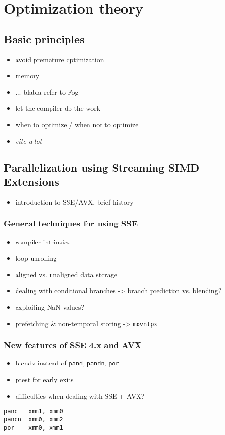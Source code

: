 \section{Optimization theory}
\subsection{Basic principles}
\begin{itemize}
\item avoid premature optimization
\item memory
\item ... blabla refer to Fog
\item let the compiler do the work
\item when to optimize / when not to optimize
\item \emph{cite a lot}
\end{itemize}
\subsection{Parallelization using Streaming SIMD Extensions}
\begin{itemize}
\item introduction to SSE/AVX, brief history
\end{itemize}
\subsubsection{General techniques for using SSE}
\begin{itemize}
\item compiler intrinsics
\item loop unrolling
\item aligned vs. unaligned data storage
\item dealing with conditional branches -> branch prediction vs. blending?
\item exploiting NaN values?
\item prefetching \& non-temporal storing -> \texttt{movntps}
\end{itemize}
\subsubsection{New features of SSE 4.x and AVX}
\begin{itemize}
\item blendv instead of \texttt{pand}, \texttt{pandn}, \texttt{por}
\item ptest for early exits
\item difficulties when dealing with SSE + AVX?
\end{itemize}
\lstset{language=XML,}
\begin{lstlisting}
pand   xmm1, xmm0
pandn  xmm0, xmm2
por    xmm0, xmm1
\end{lstlisting}
